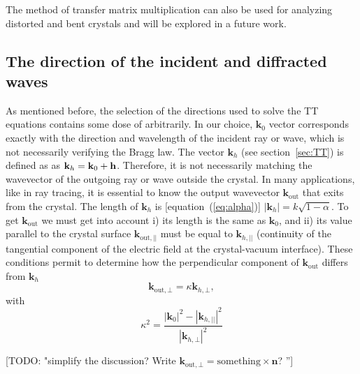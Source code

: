 \documentclass[preprint]{iucr}              %
\newcommand{\todo}[1]{{\color{red}[TODO: "#1'']}}
\newcommand{\inblue}[1]{{\color{blue}#1}}
\begin{document}
 The method of transfer matrix multiplication can also be used for analyzing distorted and bent crystals and will be explored in a future work.
%

\subsection{The direction of the incident and diffracted waves}\label{sec:directions}
\inblue{
As mentioned before, the selection of the directions used to solve the TT equations contains some dose of arbitrarily. In our choice, $\textbf{k}_0$ vector corresponds exactly with the direction and wavelength of the incident ray or wave, which is not necessarily verifying the Bragg law.
The vector $\textbf{k}_h$ (see section~\ref{sec:TT}) is defined as as $\textbf k_h=\textbf k_0 + \textbf h$. Therefore, it is not necessarily matching the wavevector of the outgoing ray or wave outside the crystal.
In many applications, like in ray tracing, it is essential to know the output wavevector $\textbf{k}_{\text{out}}$ that exits from the crystal. The length of $\textbf{k}_h$ is [equation~(\ref{eq:alpha})] $|\textbf{k}_h|=k\sqrt{1-\alpha}$.
To get $\textbf{k}_{\text{out}}$ we must get into account i) its length is the same as $\textbf{k}_0$, and ii) its value parallel to the crystal surface $\textbf{k}_{\text{out}, ||}$ must be equal to $\textbf{k}_{h,||}$ (continuity of the tangential component of the electric field at the crystal-vacuum interface).
These conditions permit to determine how the perpendicular component of $\textbf{k}_{\text{out}}$ differs from $\textbf{k}_h$
\begin{equation}
    \textbf{k}_{\text{out}, \bot} = \kappa \textbf{k}_{h,\bot},
\end{equation}
with 
\begin{equation}
    \kappa^2 = \frac{|\textbf{k}_0|^2-|\textbf{k}_{h,||}|^2}
    {|\textbf{k}_{h,\bot}|^2}
\end{equation}
}

\todo{simplify the discussion? Write $\textbf{k}_{\text{out}, \bot} = \text{something} \times \textbf{n}$? }
\end{document}
